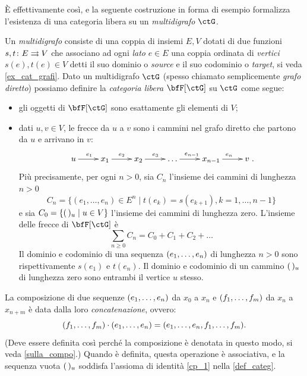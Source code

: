 È effettivamente così, e la seguente costruzione in forma di esempio formalizza l'esistenza di una categoria libera su un \emph{multidigrafo} \(\ctG\).
\begin{example}\label{ex_cat_libera}
 Un \emph{multidigrafo} consiste di una coppia di insiemi \(E,V\) dotati di due funzioni \(s,t \colon E\rightrightarrows V\) che associano ad ogni \emph{lato} \(e\in E\) una coppia ordinata di \emph{vertici} \(s(e),t(e)\in V\) detti il suo dominio o \emph{source} e il suo codominio o \emph{target}, si veda \ref{ex_cat_grafi}. Dato un multidigrafo \(\ctG\) (spesso chiamato semplicemente \emph{grafo diretto}) possiamo definire la \emph{categoria libera} \(\bfF[\ctG]\) su \(\ctG\) come segue:
 \begin{itemize}
  \item gli oggetti di \(\bfF[\ctG]\) sono esattamente gli elementi di \(V\);
  \item dati \(u,v\in V\), le frecce da \(u\) a \(v\) sono i cammini nel grafo diretto che partono da \(u\) e arrivano in \(v\):
        \[\xymatrix{u \ar[r]^{e_1}& x_1 \ar[r]^{e_2}& x_2\ar[r]^{e_3}& \dots\ar[r]^{e_{n-1}}& x_{n-1}\ar[r]^{e_n}& v}.\]
        Più precisamente, per ogni \(n>0\), sia \(C_n\) l'insieme dei cammini di lunghezza \(n>0\)
        \[C_n=\{(e_1,\ldots,e_n)\in E^n \mid t(e_k)=s(e_{k+1}), k=1,\ldots,n-1\}\]
        e sia \(C_0=\{(\,)_u \mid u\in V\}\) l'insieme dei cammini di lunghezza zero.
        L'insieme delle frecce di \(\bfF[\ctG]\) è
        \[\sum_{n\ge0}C_n = C_0 + C_1 + C_2 + \dots\]
        Il dominio e codominio di una sequenza \((\tup en,)\) di lunghezza \(n>0\) sono rispettivamente \(s(e_1)\) e \(t(e_n)\).
        Il dominio e codominio di un cammino \((\,)_u\) di lunghezza zero sono entrambi il vertice \(u\) stesso.
 \end{itemize}
 La composizione di due sequenze \((\tup en,)\) da \(x_0\) a \(x_n\) e \((\tup fm,)\) da \(x_n\) a \(x_{n+m}\) è data dalla loro \emph{concatenazione}, ovvero:
 \[(\tup fm,)\cmp(\tup en,) = (\tup en, , \tup fm,).\]
 (Deve essere definita così perché la composizione è denotata in questo modo, si veda \ref{sulla_compo}.) Quando è definita, questa operazione è associativa, e la sequenza vuota \((\,)_u\) soddisfa l'assioma di identità \ref{cp_1} nella \ref{def_categ}.
 \begin{figure}
  \begin{center}
\end{center}
\end{figure}
\end{example}
